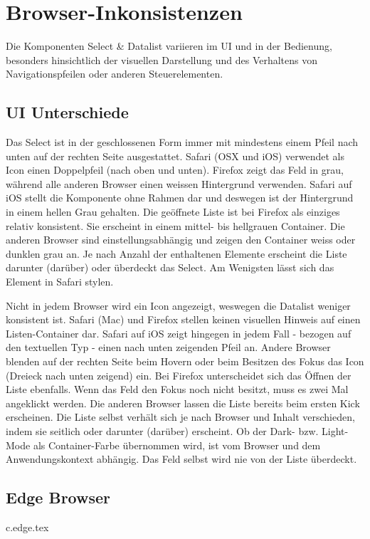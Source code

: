\clearpage
\section{Browser-Inkonsistenzen} %
Die Komponenten Select \& Datalist variieren im UI und in der Bedienung,
besonders hinsichtlich der visuellen Darstellung und des Verhaltens von Navigationspfeilen oder anderen Steuerelementen.


\subsection{UI Unterschiede}
Das Select ist in der geschlossenen Form immer mit mindestens einem Pfeil nach unten auf der rechten Seite ausgestattet.
Safari (OSX und iOS) verwendet als Icon einen Doppelpfeil (nach oben und unten).
Firefox zeigt das Feld in grau, während alle anderen Browser einen weissen Hintergrund verwenden.
Safari auf iOS stellt die Komponente ohne Rahmen dar und deswegen ist der Hintergrund in einem hellen Grau gehalten.
Die geöffnete Liste ist bei Firefox als einziges relativ konsistent. 
Sie erscheint in einem mittel- bis hellgrauen Container.
Die anderen Browser sind einstellungsabhängig und zeigen den Container weiss oder dunklen grau an.
Je nach Anzahl der enthaltenen Elemente erscheint die Liste darunter (darüber) oder überdeckt das Select. %
Am Wenigsten lässt sich das Element in Safari stylen.

Nicht in jedem Browser wird ein Icon angezeigt, weswegen die Datalist weniger konsistent ist.
Safari (Mac) und Firefox stellen keinen visuellen Hinweis auf einen Listen-Container dar.
Safari auf iOS zeigt hingegen in jedem Fall - bezogen auf den textuellen Typ - einen nach unten zeigenden Pfeil an.
Andere Browser blenden auf der rechten Seite beim Hovern oder beim Besitzen des Fokus das Icon (Dreieck nach unten zeigend) ein.
Bei Firefox unterscheidet sich das Öffnen der Liste ebenfalls. 
Wenn das Feld den Fokus noch nicht besitzt, muss es zwei Mal angeklickt werden.
Die anderen Browser lassen die Liste bereits beim ersten Kick erscheinen.
Die Liste selbst verhält sich je nach Browser und Inhalt verschieden, indem sie seitlich oder darunter (darüber) erscheint.
Ob der Dark- bzw. Light-Mode als Container-Farbe übernommen wird, ist vom Browser und dem Anwendungskontext abhängig.
Das Feld selbst wird nie von der Liste überdeckt. 

\clearpage
\subsection{Edge Browser}
{c.edge.tex}

